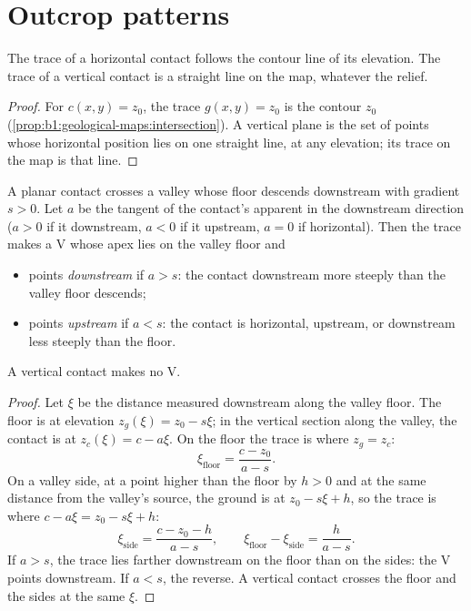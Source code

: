 \section{Outcrop patterns}

\begin{proposition}\label{prop:b1:geological-maps:hv}
The trace of a horizontal contact follows the contour line of its elevation.
The trace of a vertical contact is a straight line on the map, whatever the
relief.
\end{proposition}

\begin{proof}
For $c(x,y) = z_0$, the trace $g(x,y) = z_0$ is the contour $z_0$
(\cref{prop:b1:geological-maps:intersection}). A vertical plane is the set of
points whose horizontal position lies on one straight line, at any elevation;
its trace on the map is that line.
\end{proof}

\begin{theorem}\label{thm:b1:geological-maps:v-rule}
A planar contact crosses a valley whose floor descends downstream with
gradient $s > 0$. Let $a$ be the tangent of the contact's apparent  in
the downstream direction ($a > 0$ if it  downstream, $a < 0$ if it 
upstream, $a = 0$ if horizontal). Then the  trace makes a V whose apex
lies on the valley floor and
\begin{itemize}
  \item points \emph{downstream} if $a > s$: the contact  downstream more
        steeply than the valley floor descends;
  \item points \emph{upstream} if $a < s$: the contact is horizontal, 
        upstream, or  downstream less steeply than the floor.
\end{itemize}
A vertical contact makes no V.
\end{theorem}

\begin{proof}
Let $\xi$ be the distance measured downstream along the valley floor. The
floor is at elevation $z_g(\xi) = z_0 - s\xi$; in the vertical section
along the valley, the contact is at $z_c(\xi) = c - a\xi$. On the floor the
trace is where $z_g = z_c$:
\[
  \xi_{\text{floor}} = \frac{c - z_0}{a - s}.
\]
On a valley side, at a point higher than the floor by $h > 0$ and at the
same distance from the valley's source, the ground is at $z_0 - s\xi + h$, so
the trace is where $c - a\xi = z_0 - s\xi + h$:
\[
  \xi_{\text{side}} = \frac{c - z_0 - h}{a - s}, \qquad
  \xi_{\text{floor}} - \xi_{\text{side}} = \frac{h}{a - s}.
\]
If $a > s$, the trace lies farther downstream on the floor than on the
sides: the V points downstream. If $a < s$, the reverse. A vertical contact
crosses the floor and the sides at the same $\xi$.
\end{proof}

